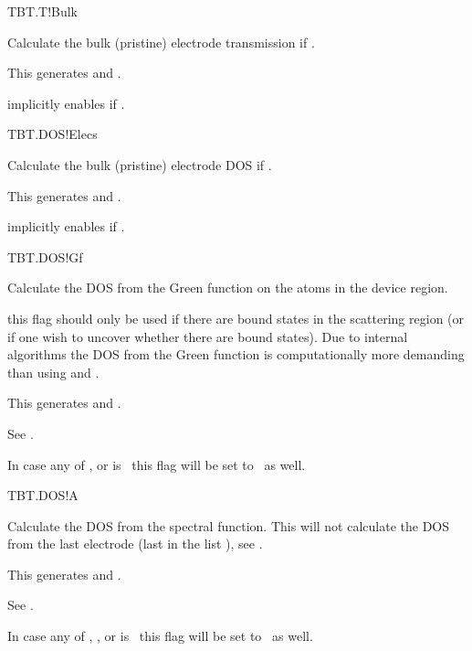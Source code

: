 \begin{fdflogicalF}{TBT.T!Bulk}

  Calculate the bulk (pristine) electrode transmission if
  \fdftrue.

  This generates  and .
  
  \note implicitly enables  if \fdftrue.

\end{fdflogicalF}

\begin{fdflogicalF}{TBT.DOS!Elecs}

  Calculate the bulk (pristine) electrode DOS if
  \fdftrue. 

  This generates  and .

  \note implicitly enables  if \fdftrue.

\end{fdflogicalF}


\begin{fdflogicalF}{TBT.DOS!Gf}

  Calculate the DOS from the Green function on the atoms in the device
  region. 

  \note this flag should only be used if there are bound states in the
  scattering region (or if one wish to uncover whether there are bound
  states). Due to internal algorithms the DOS from the Green function
  is computationally more demanding than using  and
  .

  This generates  and .

  See .

  In case any of ,  or
   is \fdftrue\ this flag will be set to \fdftrue\ as
  well.

\end{fdflogicalF}

\begin{fdflogicalF}{TBT.DOS!A}

  Calculate the DOS from the spectral function. This will not
  calculate the DOS from the last electrode (last in the list
  ), see . 

  This generates  and .

  See .

  In case any of , ,  or
   is \fdftrue\ this flag will be set to \fdftrue\ as
  well.

\end{fdflogicalF}

